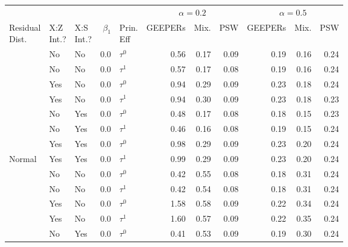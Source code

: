 
\begin{tabular}[t]{lllrlrrrrrr}
\toprule
\multicolumn{5}{c}{ } & \multicolumn{3}{c}{$\alpha=0.2$} & \multicolumn{3}{c}{$\alpha=0.5$} \\
\cmidrule(l{3pt}r{3pt}){6-8} \cmidrule(l{3pt}r{3pt}){9-11}
\makecell[l]{Residual\\Dist.} & \makecell[c]{X:Z\\Int.?} & \makecell[r]{X:S\\Int.?} & $\beta_1$ & \makecell[c]{Prin.\\Eff} & GEEPERs & Mix. & PSW & GEEPERs & Mix. & PSW\\
\midrule
 & No & No & 0.0 & $\tau^0$ & 0.56 & 0.17 & 0.09 & 0.19 & 0.16 & 0.24\\

 & No & No & 0.0 & $\tau^1$ & 0.57 & 0.17 & 0.08 & 0.19 & 0.16 & 0.24\\

 & Yes & No & 0.0 & $\tau^0$ & 0.94 & 0.29 & 0.09 & 0.23 & 0.18 & 0.24\\

 & Yes & No & 0.0 & $\tau^1$ & 0.94 & 0.30 & 0.09 & 0.23 & 0.18 & 0.23\\

 & No & Yes & 0.0 & $\tau^0$ & 0.48 & 0.17 & 0.08 & 0.18 & 0.15 & 0.23\\

 & No & Yes & 0.0 & $\tau^1$ & 0.46 & 0.16 & 0.08 & 0.19 & 0.15 & 0.24\\

 & Yes & Yes & 0.0 & $\tau^0$ & 0.98 & 0.29 & 0.09 & 0.23 & 0.20 & 0.24\\

\multirow{-8}{*}{\raggedright\arraybackslash Normal} & Yes & Yes & 0.0 & $\tau^1$ & 0.99 & 0.29 & 0.09 & 0.23 & 0.20 & 0.24\\
\cmidrule{1-11}
 & No & No & 0.0 & $\tau^0$ & 0.42 & 0.55 & 0.08 & 0.18 & 0.31 & 0.24\\

 & No & No & 0.0 & $\tau^1$ & 0.42 & 0.54 & 0.08 & 0.18 & 0.31 & 0.24\\

 & Yes & No & 0.0 & $\tau^0$ & 1.58 & 0.58 & 0.09 & 0.22 & 0.34 & 0.24\\

 & Yes & No & 0.0 & $\tau^1$ & 1.60 & 0.57 & 0.09 & 0.22 & 0.35 & 0.24\\

 & No & Yes & 0.0 & $\tau^0$ & 0.41 & 0.53 & 0.09 & 0.19 & 0.30 & 0.24\\


\end{tabular}
